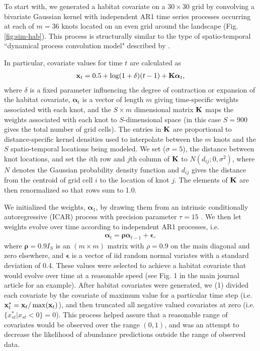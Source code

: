 \documentclass[12pt,fleqn]{article}
\begin{document}
\begin{flushleft}
To start with, we generated a habitat covariate on a $30 \times 30$ grid by convolving a bivariate Gaussian kernel with independent AR1 time series processes occurring at each of $m=36$ knots located on an even grid around the landscape (Fig. \ref{fig:sim-hab}).  This process is structurally similar to the type of spatio-temporal ``dynamical process convolution model" described by \citet{CalderEtAl2002}.



\hspace{.5in} In particular, covariate values for time $t$ are calculated as
\begin{eqnarray*}
  {\bf x}_t = 0.5 + \log(1+\delta) (t-1) + {\bf K}\boldsymbol{\alpha}_t,
\end{eqnarray*}
where $\delta$ is a fixed parameter influencing the degree of contraction or expansion of the habitat covariate, $\boldsymbol{\alpha}_t$ is a vector of length $m$ giving time-specific weights associated with each knot, and the $S \times m$ dimensional matrix ${\bf K}$ maps the weights associated with each knot to $S$-dimensional space (in this case $S=900$ gives the total number of grid cells).  The entries in ${\bf K}$ are proportional to distance-specific kernel densities used to interpolate between the $m$ knots and the $S$ spatio-temporal locations being modeled.  We set ($\sigma=5$), the distance between knot locations, and set the $i$th row and $j$th column of ${\bf K}$ to $N(d_{ij}; 0,\sigma^2)$, where $N$ denotes the Gaussian probability density function and $d_{ij}$ gives the distance from the centroid of grid cell $i$ to the location of knot $j$.  The elements of ${\bf K}$ are then renormalized so that rows sum to 1.0.

\hspace{.5in} We initialized the weights, $\boldsymbol{\alpha}_1$, by drawing them from an intrinsic conditionally autoregressive (ICAR) process with precision parameter $\tau = 15$ \citep[see e.g.][]{RueHeld2005}.  We then let weights evolve over time according to independent AR1 processes, i.e.
\begin{eqnarray}
  \boldsymbol{\alpha}_t = \boldsymbol{\rho} \boldsymbol{\alpha}_{t-1} + \boldsymbol{\epsilon},
  \label{eq:alpha}
\end{eqnarray}
where $\boldsymbol{\rho}=0.9 I_S$ is an $(m \times m)$ matrix with $\rho = 0.9$ on the main diagonal and zero elsewhere, and $\boldsymbol{\epsilon}$ is a vector of iid random normal variates with a standard deviation of 0.4.  These values were selected to achieve a habitat covariate that would evolve over time at a reasonable speed (see Fig. 1 in the main journal article for an example).  After habitat covariates were generated, we (1) divided each covariate by the covariate of maximum value for a particular time step (i.e. ${\bf x}_t^* = {\bf x}_t / \max ({\bf x}_t)$), and then truncated all negative valued covariates at zero (i.e. $\{ x_{st}^* | x_{st} < 0 \} = 0$).  This process helped assure that a reasonable range of covariates would be observed over the range $(0,1)$, and was an attempt to decrease the likelihood of abundance predictions outside the range of observed data.


\end{flushleft}
\end{document}
